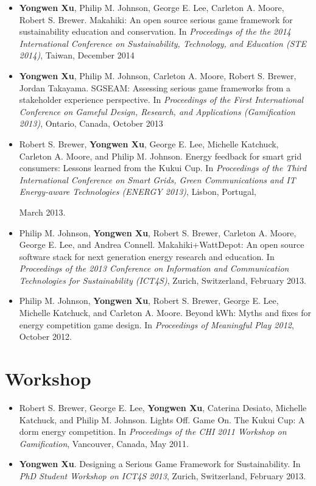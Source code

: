 \begin{itemize}

\item \textbf{Yongwen Xu}, Philip M. Johnson, George E. Lee, Carleton A. Moore, Robert S. Brewer. Makahiki: An open source serious game framework for sustainability education and conservation.   
In \emph{Proceedings of the the 2014 International Conference on Sustainability, Technology, and Education (STE 2014)}, Taiwan, December 2014
 	
\item \textbf{Yongwen Xu}, Philip M. Johnson, Carleton A. Moore, Robert S. Brewer, Jordan Takayama. SGSEAM: Assessing serious game frameworks from a stakeholder experience perspective.   
In \emph{Proceedings of the First International Conference on Gameful Design, Research, and Applications (Gamification 2013)}, Ontario, Canada, October 2013

\item Robert S. Brewer, \textbf{Yongwen Xu}, George E. Lee, Michelle Katchuck, Carleton A. Moore, and Philip M. Johnson. Energy feedback for smart grid consumers: Lessons learned from the Kukui Cup. In \emph{Proceedings of the Third International Conference on Smart Grids, Green Communications and IT Energy-aware Technologies (ENERGY 2013)}, Lisbon, Portugal, 

March 2013.

\item Philip M. Johnson, \textbf{Yongwen Xu}, Robert S. Brewer, Carleton A. Moore, George E. Lee, and Andrea Connell. Makahiki+WattDepot: An open source software stack for next generation energy research and education. In \emph{Proceedings of the 2013 Conference on Information and Communication Technologies for Sustainability (ICT4S)}, Zurich, Switzerland, February 2013.

\item Philip M. Johnson, \textbf{Yongwen Xu}, Robert S. Brewer, George E. Lee, Michelle Katchuck, and Carleton A. Moore. Beyond kWh: Myths and fixes for energy competition game design. In \emph{Proceedings of Meaningful Play 2012}, October 2012.

\end{itemize}


\section{Workshop}

\begin{itemize}

\item Robert S. Brewer, George E. Lee, \textbf{Yongwen Xu}, Caterina Desiato, Michelle Katchuck, and Philip M. Johnson. Lights Off. Game On. The Kukui Cup: A dorm energy competition. In \emph{Proceedings of the CHI 2011 Workshop on Gamification}, Vancouver, Canada, May 2011.

\item \textbf{Yongwen Xu}. Designing a Serious Game Framework for Sustainability. In \emph{PhD Student  Workshop on ICT4S 2013}, Zurich, Switzerland, February 2013.

\end{itemize}

